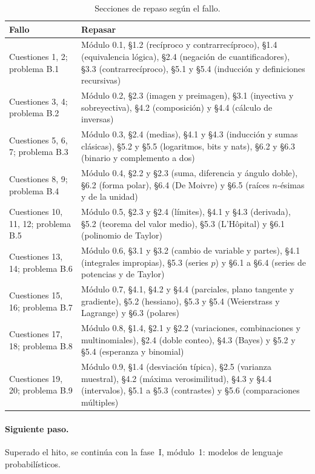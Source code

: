 \begin{table}[h]
\centering\small
\caption{Secciones de repaso según el fallo.}\label{tab:repaso}
\begin{tabularx}{\textwidth}{@{}>{\raggedright\arraybackslash}p{3.6cm}X@{}}
\toprule
Fallo & Repasar \\
\midrule
Cuestiones 1, 2; problema B.1 & Módulo 0.1, §1.2 (recíproco y contrarrecíproco), §1.4 (equivalencia lógica), §2.4 (negación de cuantificadores), §3.3 (contrarrecíproco), §5.1 y §5.4 (inducción y definiciones recursivas) \\
Cuestiones 3, 4; problema B.2 & Módulo 0.2, §2.3 (imagen y preimagen), §3.1 (inyectiva y sobreyectiva), §4.2 (composición) y §4.4 (cálculo de inversas) \\
Cuestiones 5, 6, 7; problema B.3 & Módulo 0.3, §2.4 (medias), §4.1 y §4.3 (inducción y sumas clásicas), §5.2 y §5.5 (logaritmos, bits y nats), §6.2 y §6.3 (binario y complemento a dos) \\
Cuestiones 8, 9; problema B.4 & Módulo 0.4, §2.2 y §2.3 (suma, diferencia y ángulo doble), §6.2 (forma polar), §6.4 (De Moivre) y §6.5 (raíces $n$-ésimas y de la unidad) \\
Cuestiones 10, 11, 12; problema B.5 & Módulo 0.5, §2.3 y §2.4 (límites), §4.1 y §4.3 (derivada), §5.2 (teorema del valor medio), §5.3 (L'Hôpital) y §6.1 (polinomio de Taylor) \\
Cuestiones 13, 14; problema B.6 & Módulo 0.6, §3.1 y §3.2 (cambio de variable y partes), §4.1 (integrales impropias), §5.3 (series $p$) y §6.1 a §6.4 (series de potencias y de Taylor) \\
Cuestiones 15, 16; problema B.7 & Módulo 0.7, §4.1, §4.2 y §4.4 (parciales, plano tangente y gradiente), §5.2 (hessiano), §5.3 y §5.4 (Weierstrass y Lagrange) y §6.3 (polares) \\
Cuestiones 17, 18; problema B.8 & Módulo 0.8, §1.4, §2.1 y §2.2 (variaciones, combinaciones y multinomiales), §2.4 (doble conteo), §4.3 (Bayes) y §5.2 y §5.4 (esperanza y binomial) \\
Cuestiones 19, 20; problema B.9 & Módulo 0.9, §1.4 (desviación típica), §2.5 (varianza muestral), §4.2 (máxima verosimilitud), §4.3 y §4.4 (intervalos), §5.1 a §5.3 (contrastes) y §5.6 (comparaciones múltiples) \\
\bottomrule
\end{tabularx}
\end{table}

\paragraph{Siguiente paso.} Superado el hito, se continúa con la fase~I, módulo~1: modelos de lenguaje probabilísticos.
